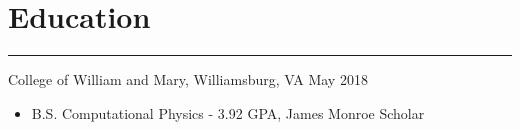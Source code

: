 \documentclass[12pt]{article}
\begin{document}
\vspace{-0.50cm}
\section*{Education}
\vspace{-0.2cm}
\hrule
\vspace{0.25cm}

\noindent College of William and Mary, Williamsburg, VA \hfill May 2018
\vspace{-0.2cm}
\begin{itemize}
  \itemsep-0.4em
        \item B.S. Computational Physics - 3.92 GPA, James Monroe Scholar
\end{itemize}
\end{document}
